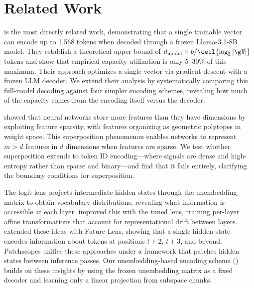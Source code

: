 \section{Related Work}
\label{sec:related}

\citet{kuratov2025cramming} is the most directly related work, demonstrating that a single trainable \memvec vector can encode up to 1,568 tokens when decoded through a frozen Llama-3.1-8B model. They establish a theoretical upper bound of $\dmodel \times b / \ceil{\log_2 \vocabsize}$ tokens and show that empirical capacity utilization is only 5--30\% of this maximum. Their approach optimizes a single vector via gradient descent with a frozen LLM decoder. We extend their analysis by systematically comparing this full-model decoding against four simpler encoding schemes, revealing how much of the capacity comes from the encoding itself versus the decoder.

\citet{elhage2022superposition} showed that neural networks store more features than they have dimensions by exploiting feature sparsity, with features organizing as geometric polytopes in weight space. This superposition phenomenon enables networks to represent $m > d$ features in $d$ dimensions when features are sparse. We test whether superposition extends to token ID encoding---where signals are dense and high-entropy rather than sparse and binary---and find that it fails entirely, clarifying the boundary conditions for superposition.

The logit lens \citep{dar2023analyzing} projects intermediate hidden states through the unembedding matrix to obtain vocabulary distributions, revealing what information is accessible at each layer. \citet{belrose2023tuned} improved this with the tuned lens, training per-layer affine transformations that account for representational drift between layers. \citet{pal2023future} extended these ideas with Future Lens, showing that a single hidden state encodes information about tokens at positions $t+2$, $t+3$, and beyond. Patchscopes \citep{ghandeharioun2024patchscopes} unifies these approaches under a framework that patches hidden states between inference passes. Our unembedding-based encoding scheme () builds on these insights by using the frozen unembedding matrix as a fixed decoder and learning only a linear projection from subspace chunks.

